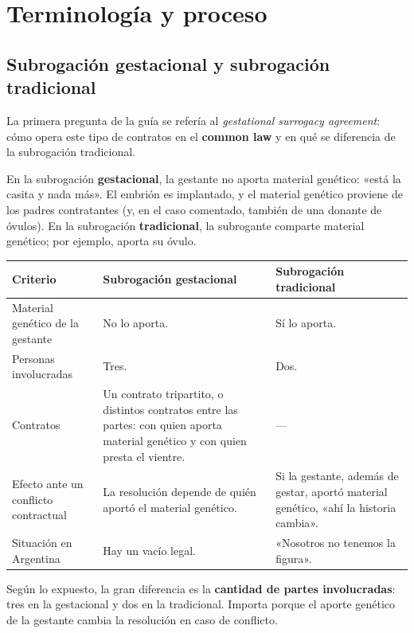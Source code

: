 \documentclass[12pt,oneside]{book}
\begin{document}
\chapter{Terminología y proceso}

\section{Subrogación gestacional y subrogación tradicional}

La primera pregunta de la guía se refería al \textit{gestational surrogacy agreement}: cómo opera este tipo de contratos en el \textbf{common law} y en qué se diferencia de la subrogación tradicional.

En la subrogación \textbf{gestacional}, la gestante no aporta material genético: «está la casita y nada más». El embrión es implantado, y el material genético proviene de los padres contratantes (y, en el caso comentado, también de una donante de óvulos). En la subrogación \textbf{tradicional}, la subrogante comparte material genético; por ejemplo, aporta su óvulo.

\begin{table}[H]
\centering
\small
\begin{tabularx}{\textwidth}{
    >{\raggedright\arraybackslash}p{}
    >{\raggedright\arraybackslash}X
    >{\raggedright\arraybackslash}X
}
\toprule
\textbf{Criterio} & \textbf{Subrogación gestacional} & \textbf{Subrogación tradicional} \\
\midrule
Material genético de la gestante & No lo aporta. & Sí lo aporta. \\
Personas involucradas & Tres. & Dos. \\
Contratos & Un contrato tripartito, o distintos contratos entre las partes: con quien aporta material genético y con quien presta el vientre. & --- \\
Efecto ante un conflicto contractual & La resolución depende de quién aportó el material genético. & Si la gestante, además de gestar, aportó material genético, «ahí la historia cambia». \\
Situación en Argentina & Hay un vacío legal. & «Nosotros no tenemos la figura». \\
\bottomrule
\end{tabularx}
\end{table}

\begin{important}
Según lo expuesto, la gran diferencia es la \textbf{cantidad de partes involucradas}: tres en la gestacional y dos en la tradicional. Importa porque el aporte genético de la gestante cambia la resolución en caso de conflicto.
\end{important}
\end{document}
